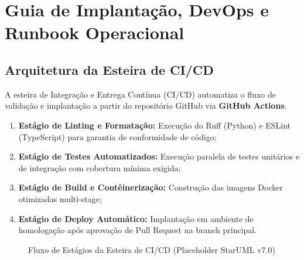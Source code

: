 \chapter{Guia de Implantação, DevOps e Runbook Operacional}
\label{chap:implantacao_devops}

\section{Arquitetura da Esteira de CI/CD}
A esteira de Integração e Entrega Contínua (CI/CD) automatiza o fluxo de validação e implantação a partir do repositório GitHub via \textbf{GitHub Actions}.

\begin{enumerate}
    \item \textbf{Estágio de Linting e Formatação:} Execução do Ruff (Python) e ESLint (TypeScript) para garantia de conformidade de código;
    \item \textbf{Estágio de Testes Automatizados:} Execução paralela de testes unitários e de integração com cobertura mínima exigida;
    \item \textbf{Estágio de Build e Contêinerização:} Construção das imagens Docker otimizadas multi-stage;
    \item \textbf{Estágio de Deploy Automático:} Implantação em ambiente de homologação após aprovação de Pull Request na branch principal.
\end{enumerate}

\begin{figure}[htbp]
    \centering
    \caption{Fluxo de Estágios da Esteira de CI/CD (Placeholder StarUML v7.0)}
    \label{fig:devops_pipeline}
\end{figure}

